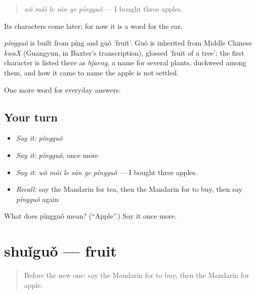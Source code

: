 \begin{quote}
\emph{wǒ mǎi le sān ge píngguǒ} — I bought three apples.
\end{quote}

Its characters come later; for now it is a word for the ear.

\begin{cousinweb}
\emph{píngguǒ} is built from píng and guǒ 'fruit'. Guǒ is inherited from Middle Chinese \emph{kwaX} (Guangyun, in Baxter's transcription), glossed 'fruit of a tree'; the first character is listed there as \emph{bjaeng}, a name for several plants, duckweed among them, and how it came to name the apple is not settled.
\end{cousinweb}

\begin{grammarlens}[title={What you've built}]
One more word for everyday answers.
\end{grammarlens}

\subsection*{Your turn}
\begin{itemize}
\raggedright
  \item \emph{Say it:} \emph{píngguǒ}
  \item \emph{Say it:} \emph{píngguǒ}, once more
  \item \emph{Say it:} \emph{wǒ mǎi le sān ge píngguǒ} — I bought three apples.
  \item \emph{Recall:} say the Mandarin for tea, then the Mandarin for to buy, then say \emph{píngguǒ} again
\end{itemize}

\begin{tcolorbox}[breakable,colback=teal!4,colframe=teal!35!black,title={Before you move on}]
What does píngguǒ mean? (\textquotedblleft{}Apple\textquotedblright{}.) Say it once more.
\end{tcolorbox}
\section[shuǐguǒ]{shuǐguǒ — fruit}

\label{lesson:ZH-C40-shuiguo}



\begin{quote}
Before the new one: say the Mandarin for to buy, then the Mandarin for apple.
\end{quote}

